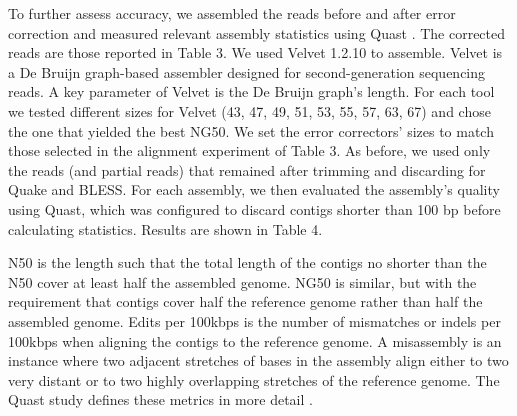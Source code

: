 \documentclass{bmcart}
\begin{document}




To further assess accuracy, we assembled the reads before and after error correction and measured relevant assembly statistics using Quast \cite{gurevich2013quast}.  The corrected reads are those reported in Table 3. We used Velvet 1.2.10\cite{zerbino2008velvet} to assemble.  Velvet is a De Bruijn graph-based assembler designed for second-generation sequencing reads.  A key parameter of Velvet is the De Bruijn graph's \kmer length.  For each tool we tested different \kmer sizes for Velvet (43, 47, 49, 51, 53, 55, 57, 63, 67) and chose the one that yielded the best NG50.  We set the error correctors' \kmer sizes to match those selected in the alignment experiment of Table 3.  As before, we used only the reads (and partial reads) that remained after trimming and discarding for Quake and BLESS.  For each assembly, we then evaluated the assembly's quality using Quast, which was configured to discard contigs shorter than 100 bp before calculating statistics. Results are shown in Table 4.


N50 is the length such that the total length of the contigs no shorter than the N50 cover at least half the assembled genome.  NG50 is similar, but with the requirement that contigs cover half the reference genome rather than half the assembled genome. Edits per 100kbps is the number of mismatches or indels per 100kbps when aligning the contigs to the reference genome. A misassembly is an instance where two adjacent stretches of bases in the assembly align either to two very distant or to two highly overlapping stretches of the reference genome.  The Quast study defines these metrics in more detail \cite{gurevich2013quast}.
\end{document}

